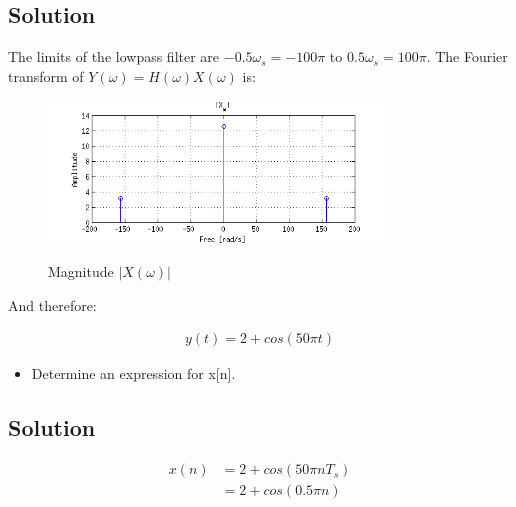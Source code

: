 \subsection*{Solution}

The limits of the lowpass filter are $-0.5 \omega_s = -100 \pi$ to $0.5 \omega_s = 100 \pi$.
The Fourier transform of $Y(\omega) = H(\omega)X(\omega)$ is:

\begin{figure}[H]
\caption{Magnitude $|X(\omega)|$}
\centering
\includegraphics[width=0.8\textwidth]{figs/c3p33.png}
\label{fig:c3p33}
\end{figure}

And therefore:

\begin{equation*}
\begin{aligned}
y(t) = 2 + cos(50 \pi t)
\end{aligned}
\end{equation*} 

\begin{itemize}
\item Determine an expression for x[n].
\end{itemize} 

\subsection*{Solution}

\begin{equation*}
\begin{aligned}
x(n) &= 2 + cos(50 \pi n T_s) \\
     &= 2 + cos(0.5 \pi n)
\end{aligned}
\end{equation*} 
